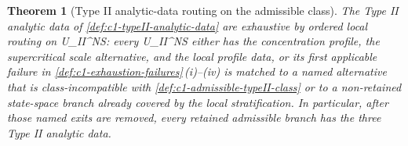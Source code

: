 \documentclass[11pt]{amsart}
\def\({}%
\def\){}%
\def\mathrm#1{#1}%
\theoremstyle{plain}
\newtheorem{theorem}{Theorem}[section]
\theoremstyle{definition}
\theoremstyle{remark}
\begin{document}
\begin{theorem}[Type II analytic-data routing on the admissible class]
\label{paper6a:thm:typeII-analytic-data-exhaustive}
The Type II analytic data of \cref{def:c1-typeII-analytic-data} are
exhaustive by ordered local routing on
\(\mathcal U_{\mathrm{II}}^{NS}\): every
\(\omega\in\mathcal U_{\mathrm{II}}^{NS}\) either has the concentration
profile, the supercritical scale alternative, and the local profile data, or
its first applicable failure in
\cref{def:c1-exhaustion-failures}\,\textup{(i)}--\textup{(iv)} is matched to a
named alternative that is class-incompatible with
\cref{def:c1-admissible-typeII-class} or to a non-retained state-space branch
already covered by the local stratification.  In particular, after those named
exits are removed, every retained admissible branch has the three Type II
analytic data.
\end{theorem}
\end{document}
